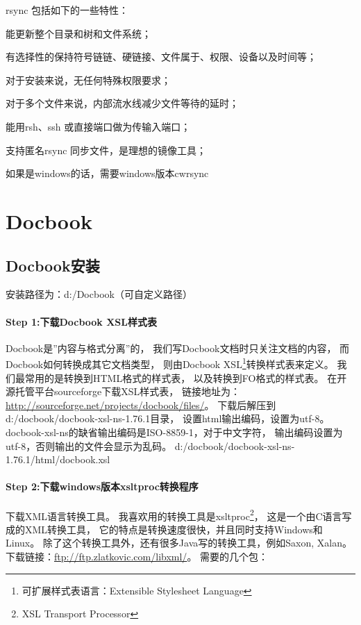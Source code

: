 \documentclass{book}
\begin{document}
rsync 包括如下的一些特性：

能更新整个目录和树和文件系统；

有选择性的保持符号链链、硬链接、文件属于、权限、设备以及时间等；

对于安装来说，无任何特殊权限要求；

对于多个文件来说，内部流水线减少文件等待的延时；

能用rsh、ssh 或直接端口做为传输入端口；

支持匿名rsync 同步文件，是理想的镜像工具；

如果是windows的话，需要windows版本cwrsync

\section{Docbook}

\subsection{Docbook安装}

安装路径为：d:/Docbook（可自定义路径）

\paragraph{Step 1:下载Docbook XSL样式表}

Docbook是”内容与格式分离”的，
我们写Docbook文档时只关注文档的内容，
而Docbook如何转换成其它文档类型，
则由Docbook XSL\footnote{可扩展样式表语言：Extensible Stylesheet Language}转换样式表来定义。
我们最常用的是转换到HTML格式的样式表，
以及转换到FO格式的样式表。 
在开源托管平台sourceforge下载XSL样式表，
链接地址为：\url{http://sourceforge.net/projects/docbook/files/}。
下载后解压到d:/docbook/docbook-xsl-ns-1.76.1目录，
设置html输出编码，设置为utf-8。
docbook-xsl-ns的缺省输出编码是ISO-8859-1，对于中文字符，
输出编码设置为utf-8，否则输出的文件会显示为乱码。
d:/docbook/docbook-xsl-ns-1.76.1/html/docbook.xsl

\paragraph{Step 2:下载windows版本xsltproc转换程序}

下载XML语言转换工具。
我喜欢用的转换工具是xsltproc\footnote{XSL Transport Processor}，
这是一个由C语言写成的XML转换工具，
它的特点是转换速度很快，并且同时支持Windows和Linux。
除了这个转换工具外，还有很多Java写的转换工具，例如Saxon, Xalan。 
下载链接：\url{ftp://ftp.zlatkovic.com/libxml/}。
需要的几个包：
\end{document}
